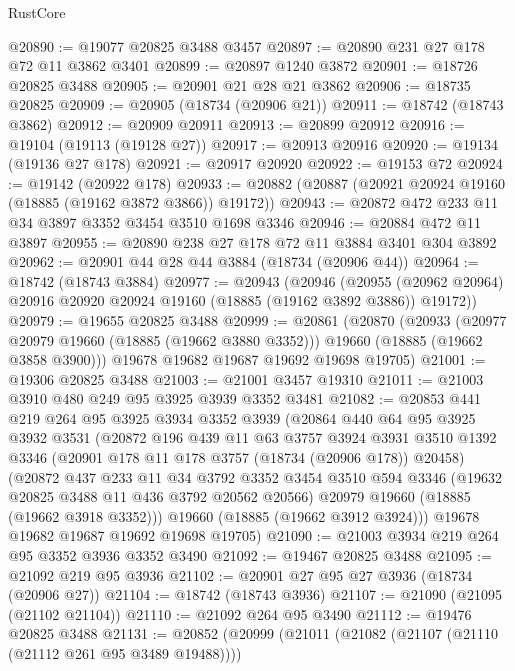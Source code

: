 \begin{lexlean}{RustCore}
\begin{coremodule}
@20890 := @19077 @20825 @3488 @3457
@20897 := @20890 @231 @27 @178 @72 @11 @3862 @3401
@20899 := @20897 @1240 @3872
@20901 := @18726 @20825 @3488
@20905 := @20901 @21 @28 @21 @3862
@20906 := @18735 @20825
@20909 := @20905 (@18734 (@20906 @21))
@20911 := @18742 (@18743 @3862)
@20912 := @20909 @20911
@20913 := @20899 @20912
@20916 := @19104 (@19113 (@19128 @27))
@20917 := @20913 @20916
@20920 := @19134 (@19136 @27 @178)
@20921 := @20917 @20920
@20922 := @19153 @72
@20924 := @19142 (@20922 @178)
@20933 := @20882 (@20887 (@20921 @20924 @19160 (@18885 (@19162 @3872 @3866)) @19172))
@20943 := @20872 @472 @233 @11 @34 @3897 @3352 @3454 @3510 @1698 @3346
@20946 := @20884 @472 @11 @3897
@20955 := @20890 @238 @27 @178 @72 @11 @3884 @3401 @304 @3892
@20962 := @20901 @44 @28 @44 @3884 (@18734 (@20906 @44))
@20964 := @18742 (@18743 @3884)
@20977 := @20943
    (@20946
      (@20955 (@20962 @20964) @20916 @20920 @20924 @19160 (@18885 (@19162 @3892 @3886)) @19172))
@20979 := @19655 @20825 @3488
@20999 := @20861
    (@20870
      (@20933
        (@20977 @20979 @19660 (@18885 (@19662 @3880 @3352)))
        @19660
        (@18885 (@19662 @3858 @3900)))
      @19678
      @19682
      @19687
      @19692
      @19698
      @19705)
@21001 := @19306 @20825 @3488
@21003 := @21001 @3457 @19310
@21011 := @21003 @3910 @480 @249 @95 @3925 @3939 @3352 @3481
@21082 := @20853
    @441
    @219
    @264
    @95
    @3925
    @3934
    @3352
    @3939
    (@20864
      @440
      @64
      @95
      @3925
      @3932
      @3531
      (@20872
        @196
        @439
        @11
        @63
        @3757
        @3924
        @3931
        @3510
        @1392
        @3346
        (@20901 @178 @11 @178 @3757 (@18734 (@20906 @178)) @20458)
        (@20872
          @437
          @233
          @11
          @34
          @3792
          @3352
          @3454
          @3510
          @594
          @3346
          (@19632 @20825 @3488 @11 @436 @3792 @20562 @20566)
          @20979
          @19660
          (@18885 (@19662 @3918 @3352)))
        @19660
        (@18885 (@19662 @3912 @3924)))
      @19678
      @19682
      @19687
      @19692
      @19698
      @19705)
@21090 := @21003 @3934 @219 @264 @95 @3352 @3936 @3352 @3490
@21092 := @19467 @20825 @3488
@21095 := @21092 @219 @95 @3936
@21102 := @20901 @27 @95 @27 @3936 (@18734 (@20906 @27))
@21104 := @18742 (@18743 @3936)
@21107 := @21090 (@21095 (@21102 @21104))
@21110 := @21092 @264 @95 @3490
@21112 := @19476 @20825 @3488
@21131 := @20852
    (@20999
      (@21011
        (@21082 (@21107 (@21110 (@21112 @261 @95 @3489 @19488))))

\end{coremodule}
\end{lexlean}
